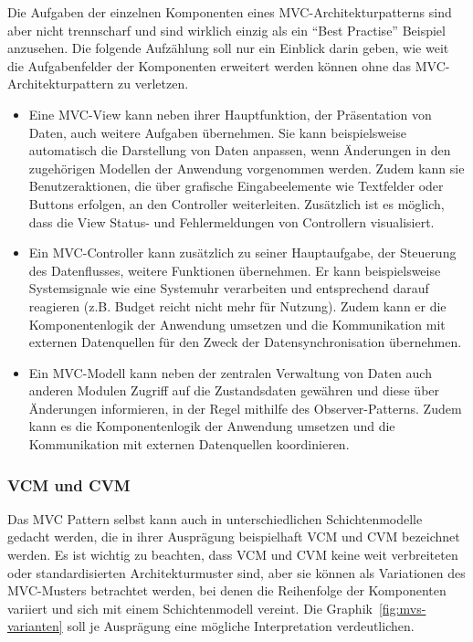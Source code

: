 Die Aufgaben der einzelnen Komponenten eines MVC-Architekturpatterns sind aber nicht trennscharf und sind wirklich einzig als ein \enquote{Best Practise} Beispiel anzusehen. Die folgende Aufzählung soll nur ein Einblick darin geben, wie weit die Aufgabenfelder der Komponenten erweitert werden können ohne das MVC-Architekturpattern zu verletzen. 
\begin{itemize}
\item Eine MVC-View kann neben ihrer Hauptfunktion, der Präsentation von Daten, auch weitere Aufgaben übernehmen. Sie kann beispielsweise automatisch die Darstellung von Daten anpassen, wenn Änderungen in den zugehörigen Modellen der Anwendung vorgenommen werden. Zudem kann sie Benutzeraktionen, die über grafische Eingabeelemente wie Textfelder oder Buttons erfolgen, an den Controller weiterleiten. Zusätzlich ist es möglich, dass die View Status- und Fehlermeldungen von Controllern visualisiert.

\item Ein MVC-Controller kann zusätzlich zu seiner Hauptaufgabe, der Steuerung des Datenflusses, weitere Funktionen übernehmen. Er kann beispielsweise Systemsignale wie eine Systemuhr verarbeiten und entsprechend darauf reagieren (z.B. Budget reicht nicht mehr für Nutzung). Zudem kann er die Komponentenlogik der Anwendung umsetzen und die Kommunikation mit externen Datenquellen für den Zweck der Datensynchronisation übernehmen.

\item Ein MVC-Modell kann neben der zentralen Verwaltung von Daten auch anderen Modulen Zugriff auf die Zustandsdaten gewähren und diese über Änderungen informieren, in der Regel mithilfe des Observer-Patterns. Zudem kann es die Komponentenlogik der Anwendung umsetzen und die Kommunikation mit externen Datenquellen koordinieren.
\end{itemize}

\subsubsection{VCM und CVM}
Das MVC Pattern selbst kann auch in unterschiedlichen Schichtenmodelle gedacht werden, die in ihrer Ausprägung beispielhaft VCM und CVM bezeichnet werden.  Es ist wichtig zu beachten, dass VCM und CVM keine weit verbreiteten oder standardisierten Architekturmuster sind, aber sie können als Variationen des MVC-Musters betrachtet werden, bei denen die Reihenfolge der Komponenten variiert und sich mit einem Schichtenmodell vereint. Die Graphik~\ref{fig:mvs-varianten} soll je Ausprägung eine mögliche Interpretation verdeutlichen.


